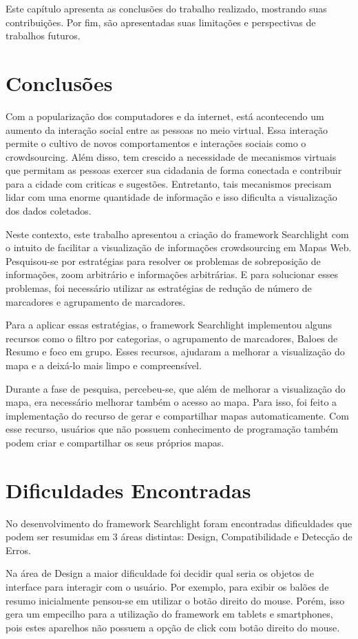 Este capítulo apresenta as conclusões do trabalho realizado, mostrando suas contribuições. Por fim, são apresentadas suas limitações e perspectivas de trabalhos futuros.

\section{Conclusões}
Com a popularização dos computadores e da internet, está acontecendo um aumento da interação social entre as pessoas no meio virtual. Essa interação permite o cultivo de novos comportamentos e interações sociais como o crowdsourcing. Além disso, tem crescido a necessidade de mecanismos virtuais que permitam as pessoas exercer sua cidadania de forma conectada e contribuir para a cidade com  criticas e sugestões. Entretanto, tais mecanismos precisam lidar com uma enorme quantidade de informação e isso dificulta a visualização dos dados coletados.

Neste contexto, este trabalho apresentou a criação do framework Searchlight com o intuito de facilitar a visualização de informações crowdsourcing em Mapas Web. Pesquisou-se por estratégias para resolver os problemas de sobreposição de informações, zoom arbitrário e informações arbitrárias. E para solucionar esses problemas, foi necessário utilizar as estratégias de redução de número de marcadores e agrupamento de marcadores.

Para a aplicar essas estratégias, o framework Searchlight implementou alguns recursos como o filtro por categorias, o agrupamento de marcadores, Baloes de Resumo e foco em grupo. Esses recursos, ajudaram a melhorar a visualização do mapa e a deixá-lo mais limpo e compreensível.

Durante a fase de pesquisa, percebeu-se, que além de melhorar a visualização do mapa, era necessário  melhorar também o acesso ao mapa. Para isso, foi feito a implementação do recurso de gerar e compartilhar mapas automaticamente. Com esse recurso, usuários que não possuem conhecimento de programação também podem criar  e compartilhar os seus próprios mapas.

\section{Dificuldades Encontradas}
No desenvolvimento do framework Searchlight foram encontradas dificuldades que podem ser resumidas em 3 áreas distintas: Design, Compatibilidade e Detecção de Erros.

Na área de Design a maior dificuldade foi decidir qual seria os objetos de interface para interagir com o usuário. Por exemplo, para exibir os balões de resumo inicialmente pensou-se em utilizar o botão direito do mouse. Porém, isso gera um empecilho para a utilização do framework em tablets e smartphones, pois estes aparelhos não possuem a opção de click com botão direito do mouse. 


